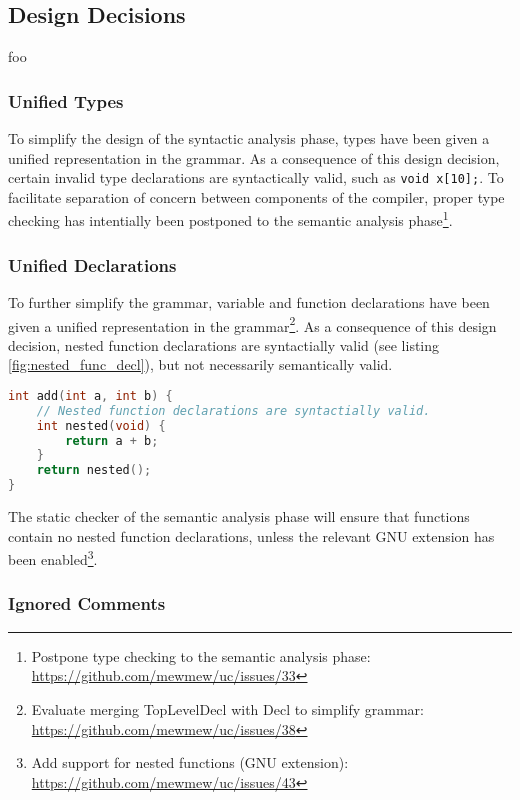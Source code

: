 \subsection{Design Decisions}

foo

\subsubsection{Unified Types}

To simplify the design of the syntactic analysis phase, types have been given a unified representation in the grammar. As a consequence of this design decision, certain invalid type declarations are syntactically valid, such as \texttt{void x[10];}. To facilitate separation of concern between components of the compiler, proper type checking has intentially been postponed to the semantic analysis phase\footnote{Postpone type checking to the semantic analysis phase: \url{https://github.com/mewmew/uc/issues/33}}.

\subsubsection{Unified Declarations}

To further simplify the grammar, variable and function declarations have been given a unified representation in the grammar\footnote{Evaluate merging TopLevelDecl with Decl to simplify grammar: \url{https://github.com/mewmew/uc/issues/38}}. As a consequence of this design decision, nested function declarations are syntactially valid (see listing \ref{fig:nested_func_decl}), but not necessarily semantically valid.

\begin{lstlisting}[language=C,style=c,caption={\label{fig:nested_func_decl}Nested function declarations.}]
int add(int a, int b) {
	// Nested function declarations are syntactially valid.
	int nested(void) {
		return a + b;
	}
	return nested();
}
\end{lstlisting}

The static checker of the semantic analysis phase will ensure that functions contain no nested function declarations, unless the relevant GNU extension has been enabled\footnote{Add support for nested functions (GNU extension): \url{https://github.com/mewmew/uc/issues/43}}.

\subsubsection{Ignored Comments}

